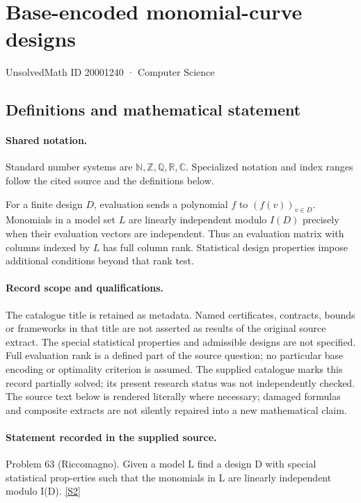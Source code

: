 \documentclass[11pt]{article}
\newcommand{\sref}[2]{\hyperlink{source:#1:#2}{[S#2]}}
\begin{document}
\setcounter{section}{20001239}
\section{Base-encoded monomial-curve designs}\label{20001240}
{\small\sffamily UnsolvedMath ID 20001240 · Computer Science}
\subsection{Definitions and mathematical statement}

\paragraph{Shared notation.}Standard number systems are $\mathbb N,\mathbb Z,\mathbb Q,\mathbb R,\mathbb C$. Specialized notation and index ranges follow the cited source and the definitions below.


For a finite design $D$, evaluation sends a polynomial $f$ to $(f(v))_{v\in D}$. Monomials in a model set $L$ are linearly independent modulo $I(D)$ precisely when their evaluation vectors are independent. Thus an evaluation matrix with columns indexed by $L$ has full column rank. Statistical design properties impose additional conditions beyond that rank test.
\paragraph{Record scope and qualifications.}
The catalogue title is retained as metadata. Named certificates, contracts, bounds or frameworks in that title are not asserted as results of the original source extract.
The special statistical properties and admissible designs are not specified. Full evaluation rank is a defined part of the source question; no particular base encoding or optimality criterion is assumed. The supplied catalogue marks this record partially solved; its present research status was not independently checked.
The source text below is rendered literally where necessary; damaged formulas and composite extracts are not silently repaired into a new mathematical claim.
\paragraph{Statement recorded in the supplied source.}
Problem 63 (Riccomagno). Given a model L find a design D with special statistical prop-erties such that the monomials in L are linearly independent modulo I(D). \sref{20001240}{2}
\end{document}
